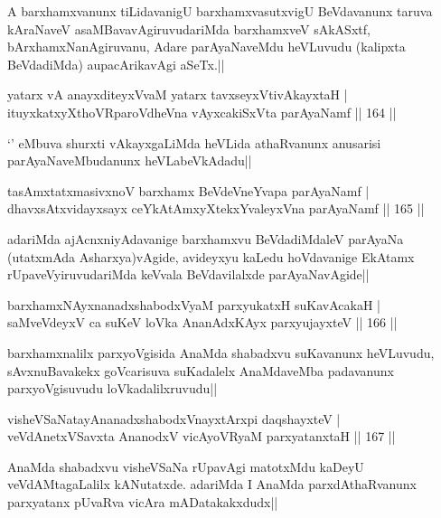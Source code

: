 \begin{artha}
A barxhamxvanunx tiLidavanigU barxhamxvasutxvigU BeVdavanunx taruva kAraNaveV asaMBavavAgiruvudariMda barxhamxveV sAkASxtf, bArxhamxNanAgiruvanu, Adare parAyaNaveMdu heVLuvudu (kalipxta BeVdadiMda) aupacArikavAgi aSeTx.||
\end{artha}

\begin{shl}
yatarx vA anayxditeyxVvaM yatarx tavxseyxVtivAkayxtaH |\\
ituyxkatxyXthoVRparoVdheVna vAyxcakiSxVta parAyaNamf \hfill || 164 ||
\end{shl}

\begin{artha}%
`\stext ' eMbuva shurxti vAkayxgaLiMda heVLida athaRvanunx anusarisi parAyaNaveMbudanunx heVLabeVkAdadu||
\end{artha}

\begin{shl}
tasAmxtatxmasivxnoV barxhamx BeVdeVneYvapa parAyaNamf |\\
dhavxsAtxvidayxsayx ceYkAtAmxyXtekxYvaleyxVna parAyaNamf \hfill || 165 ||
\end{shl}

\begin{artha}
adariMda ajAcnxniyAdavanige barxhamxvu BeVdadiMdaleV parAyaNa (utatxmAda Asharxya)vAgide, avideyxyu kaLedu hoVdavanige EkAtamx rUpaveVyiruvudariMda keVvala BeVdavilalxde parAyaNavAgide||
\end{artha}

\begin{shl}
barxhamxNAyxnanadxshabodxV\s yaM parxyukatxH suKavAcakaH |\\
saMveVdeyxV ca suKeV loVka AnanAdxKAyx parxyujayxteV \hfill || 166 ||
\end{shl}

\begin{artha}
barxhamxnalilx parxyoVgisida AnaMda shabadxvu suKavanunx heVLuvudu, sAvxnuBavakekx goVcarisuva suKadalelx AnaMdaveMba padavanunx parxyoVgisuvudu loVkadalilxruvudu||
\end{artha}

\begin{shl}
visheVSaNatayA\s \s nanadxshabodxV\s nayxtArxpi daqshayxteV |\\
veVdAnetxVSavxta AnanodxV vicAyoVR\s yaM parxyatanxtaH \hfill || 167 ||
\end{shl}

\begin{artha}
AnaMda shabadxvu visheVSaNa rUpavAgi matotxMdu kaDeyU veVdAMtagaLalilx kANutatxde. adariMda I AnaMda parxdAthaRvanunx parxyatanx pUvaRva vicAra mADatakakxdudx||
\end{artha}

